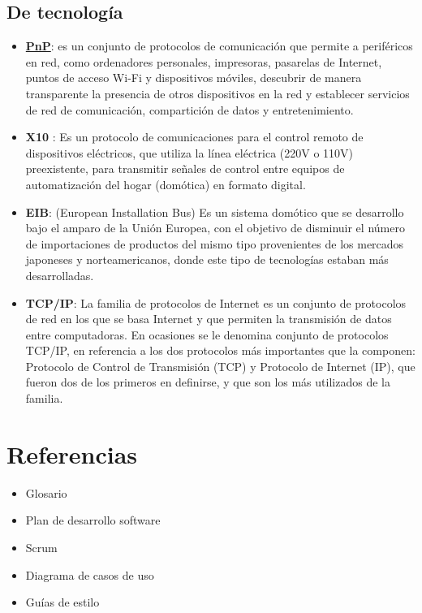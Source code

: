     \subsection{De tecnología}
    	\begin{itemize}
    		\item {\bf \href{http://es.wikipedia.org/wiki/Universal_Plug_and_Play}{PnP}}: es un conjunto de protocolos de comunicación que permite a periféricos en red, como ordenadores personales, impresoras, pasarelas de Internet, puntos de acceso Wi-Fi y dispositivos móviles, descubrir de manera transparente la presencia de otros dispositivos en la red y establecer servicios de red de comunicación, compartición de datos y entretenimiento.
    		\item {\bf X10 }: Es un protocolo de comunicaciones para el control remoto de dispositivos eléctricos, que utiliza la línea eléctrica (220V o 110V) preexistente, para transmitir señales de control entre equipos de automatización del hogar (domótica) en formato digital.
    		\item {\bf EIB}: (European Installation Bus) Es un sistema domótico que se desarrollo bajo el
    		amparo de la Unión Europea, con el objetivo de disminuir el número de importaciones de
    		productos del mismo tipo provenientes de los mercados japoneses y norteamericanos,
    		donde este tipo de tecnologías estaban más desarrolladas.
    		\item {\bf TCP/IP}: La familia de protocolos de Internet es un conjunto de protocolos de red en los que se basa Internet y que permiten la transmisión de datos entre computadoras. En ocasiones se le denomina conjunto de protocolos TCP/IP, en referencia a los dos protocolos más importantes que la componen: Protocolo de Control de Transmisión (TCP) y Protocolo de Internet (IP), que fueron dos de los primeros en definirse, y que son los más utilizados de la familia. 
    	\end{itemize}
    	

\section{Referencias}
    \begin{itemize}
        \item Glosario
        \item Plan de desarrollo software
        \item Scrum
        \item Diagrama de casos de uso
        \item Guías de estilo
    \end{itemize}
